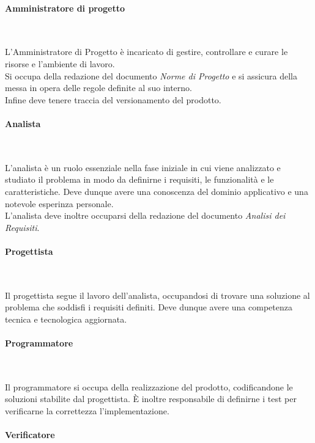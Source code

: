         \paragraph{Amministratore di progetto} ~

        L’Amministratore di Progetto è incaricato di gestire, controllare e curare le risorse e l'ambiente di lavoro.\\
        Si occupa della redazione del documento \textit{Norme di Progetto} e si assicura della messa in opera delle regole definite al suo interno.\\
        Infine deve tenere traccia del versionamento del prodotto.

        \paragraph{Analista} ~

        L'analista è un ruolo essenziale nella fase iniziale in cui viene analizzato e studiato il problema in modo da definirne i requisiti, le funzionalità e le caratteristiche. Deve dunque avere una conoscenza del dominio applicativo e una notevole esperinza personale.\\
        L'analista deve inoltre occuparsi della redazione del documento \textit{Analisi dei Requisiti}.

        \paragraph{Progettista} ~

        Il progettista segue il lavoro dell'analista, occupandosi di trovare una soluzione al problema che soddisfi i requisiti definiti. Deve dunque avere una competenza tecnica e tecnologica aggiornata.

        \paragraph{Programmatore} ~

        Il programmatore si occupa della realizzazione del prodotto, codificandone le soluzioni stabilite dal progettista.
        È inoltre responsabile di definirne i test per verificarne la correttezza l'implementazione.



        \paragraph{Verificatore} ~

